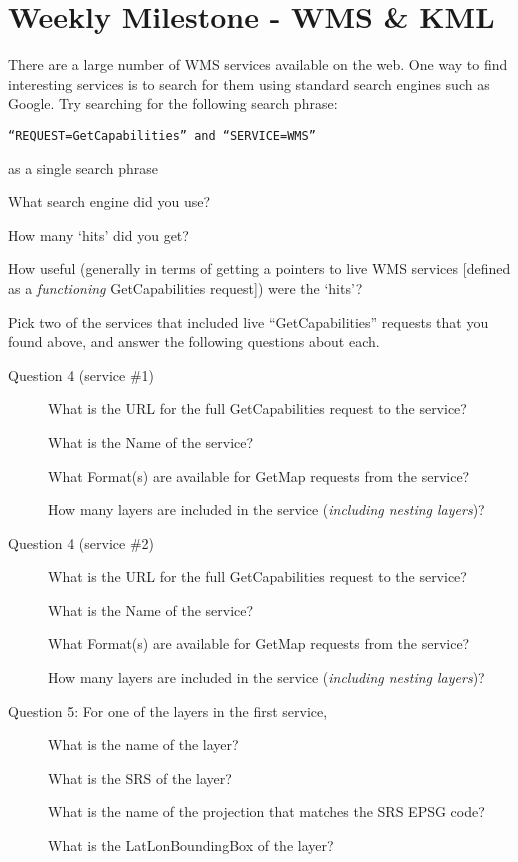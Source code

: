 \documentclass[]{book}
\providecommand{\tightlist}{%
  \setlength{\itemsep}{0pt}\setlength{\parskip}{0pt}}
\begin{document}
\section{Weekly Milestone - WMS \& KML}\label{week06-milestone}

There are a large number of WMS services available on the web. One way
to find interesting services is to search for them using standard search
engines such as Google. Try searching for the following search phrase:

\texttt{“REQUEST=GetCapabilities”\ and\ “SERVICE=WMS”}

as a single search phrase

\begin{description}
\tightlist
\item[Question 1]
What search engine did you use?
\item[Question 2]
How many `hits' did you get?
\item[Question 3]
How useful (generally in terms of getting a pointers to live WMS
services {[}defined as a \emph{functioning} GetCapabilities request{]})
were the `hits'?
\end{description}

Pick two of the services that included live ``GetCapabilities'' requests
that you found above, and answer the following questions about each.

\begin{description}
\item[Question 4 (service \#1)]
What is the URL for the full GetCapabilities request to the service?

What is the Name of the service?

What Format(s) are available for GetMap requests from the service?

How many layers are included in the service (\emph{including nesting
layers})?
\item[Question 4 (service \#2)]
What is the URL for the full GetCapabilities request to the service?

What is the Name of the service?

What Format(s) are available for GetMap requests from the service?

How many layers are included in the service (\emph{including nesting
layers})?
\item[Question 5: For one of the layers in the first service,]
What is the name of the layer?

What is the SRS of the layer?

What is the name of the projection that matches the SRS EPSG code?

What is the LatLonBoundingBox of the layer?
\end{description}
\end{document}
